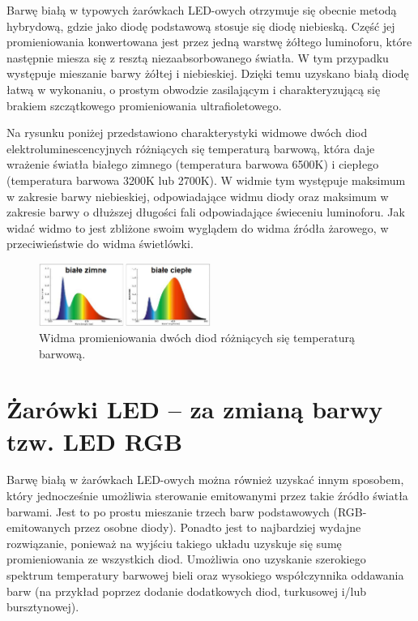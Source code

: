 \documentclass[12pt,a4paper]{book}
\begin{document}
Barwę białą w typowych żarówkach LED-owych otrzymuje się obecnie metodą hybrydową, gdzie jako diodę podstawową stosuje się diodę niebieską. Część jej promieniowania konwertowana jest przez jedną warstwę żółtego luminoforu, które następnie miesza się z resztą niezaabsorbowanego światła. W tym przypadku występuje mieszanie barwy żółtej i niebieskiej. Dzięki temu uzyskano białą diodę łatwą w wykonaniu, o prostym obwodzie zasilającym i charakteryzującą się brakiem szczątkowego promieniowania ultrafioletowego. 

Na rysunku poniżej przedstawiono charakterystyki widmowe dwóch diod elektroluminescencyjnych różniących się temperaturą barwową, która daje wrażenie światła białego zimnego (temperatura barwowa 6500K) i ciepłego (temperatura barwowa 3200K lub 2700K). W widmie tym występuje maksimum w zakresie barwy niebieskiej, odpowiadające widmu diody oraz maksimum w zakresie barwy o dłuższej długości fali odpowiadające świeceniu luminoforu. Jak widać widmo to jest zbliżone swoim wyglądem do widma źródła żarowego, w przeciwieństwie do widma świetlówki.

\begin{figure}[ht]
  \centering
  \includegraphics[width=0.5\textwidth]{Rysunek4.jpg}
  \caption{Widma promieniowania dwóch diod różniących się temperaturą barwową.}
  \label{Rys.3.1.}
\end{figure}

\section*{Żarówki LED – za zmianą barwy tzw. LED RGB}

Barwę białą w żarówkach LED-owych można również uzyskać innym sposobem, który jednocześnie umożliwia sterowanie emitowanymi przez takie źródło światła barwami. Jest to po prostu mieszanie trzech barw podstawowych (RGB-emitowanych przez osobne diody). Ponadto jest to najbardziej wydajne rozwiązanie, ponieważ na wyjściu takiego układu uzyskuje się sumę promieniowania ze wszystkich diod. Umożliwia ono uzyskanie szerokiego spektrum temperatury barwowej bieli oraz wysokiego współczynnika oddawania barw (na przykład poprzez dodanie dodatkowych diod, turkusowej i/lub bursztynowej). 
\end{document}
